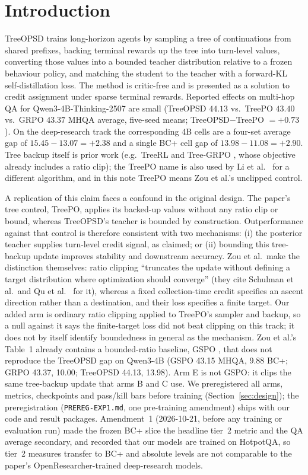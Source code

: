 \documentclass[11pt]{article}
\begin{document}
\section{Introduction}

TreeOPSD \cite{treeopsd} trains long-horizon agents by sampling a tree of
continuations from shared prefixes, backing terminal rewards up the tree
into turn-level values, converting those values into a bounded teacher
distribution relative to a frozen behaviour policy, and matching the
student to the teacher with a forward-KL self-distillation loss. The
method is critic-free and is presented as a solution to credit assignment
under sparse terminal rewards. Reported effects on multi-hop QA for
Qwen3-4B-Thinking-2507 are small (TreeOPSD $44.13$ vs.\ TreePO $43.40$
vs.\ GRPO $43.37$ MHQA average, five-seed means; TreeOPSD$-$TreePO
$=+0.73$). On the deep-research track the corresponding 4B cells are a
four-set average gap of $15.45-13.07=+2.38$ and a single BC+ cell gap of
$13.98-11.08=+2.90$. Tree backup itself is prior work
(e.g.\ TreeRL \cite{treerl} and Tree-GRPO \cite{treegrpo}, whose
objective already includes a ratio clip); the TreePO name is also used by
Li et al.\ \cite{treepo-li} for a different algorithm, and in this note
TreePO means Zou et al.'s unclipped control.

A replication of this claim faces a confound in the original design. The
paper's tree control, TreePO, applies its backed-up values without any
ratio clip or bound, whereas TreeOPSD's teacher is bounded by
construction. Outperformance against that control is therefore consistent
with two mechanisms: (i) the posterior teacher supplies turn-level credit
signal, as claimed; or (ii) bounding this tree-backup update improves
stability and downstream accuracy. Zou et al.\ make the distinction
themselves: ratio clipping \cite{ppo} ``truncates the update without
defining a target distribution where optimization should converge''
(they cite Schulman et al.\ and Qu et al.\ \cite{qu2026a} for it),
whereas a fixed collection-time credit specifies an ascent direction
rather than a destination, and their loss specifies a finite target.
Our added arm is ordinary ratio clipping \cite{ppo} applied to TreePO's
sampler and backup, so a null against it says the finite-target loss
did not beat clipping on this track; it does not by itself identify
boundedness in general as the mechanism. Zou et al.'s Table~1 already
contains a bounded-ratio baseline, GSPO \cite{gspo}, that does not
reproduce the TreeOPSD gap on Qwen3-4B (GSPO 43.15 MHQA, 9.88 BC+;
GRPO 43.37, 10.00; TreeOPSD 44.13, 13.98). Arm E is not GSPO: it clips
the same tree-backup update that arms B and C use. We preregistered all
arms, metrics, checkpoints and pass/kill bars before training
(Section~\ref{sec:design}); the preregistration
(\texttt{PREREG-EXP1.md}, one pre-training amendment) ships with our code
and result packages. Amendment~1 (2026-10-21, before any training or
evaluation run) made the frozen BC+ slice the headline tier~2 metric and
the QA average secondary, and recorded that our models are trained on
HotpotQA, so tier~2 measures transfer to BC+ and absolute levels are not
comparable to the paper's OpenResearcher-trained deep-research models.
\end{document}
